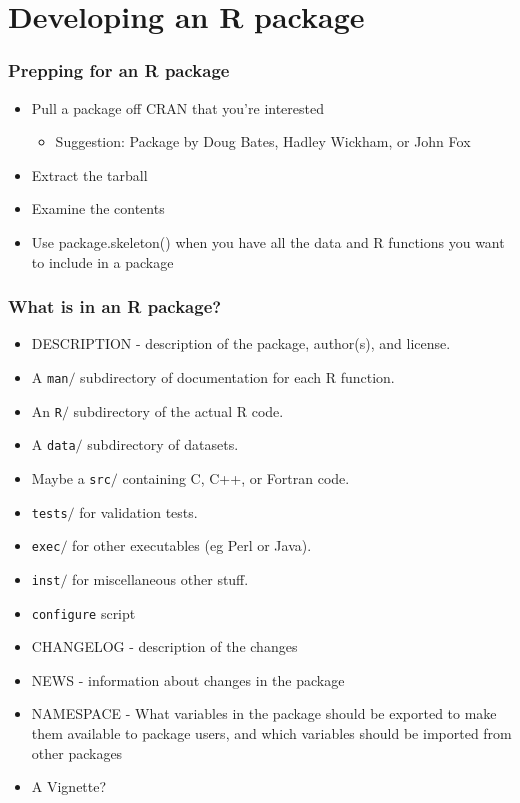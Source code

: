 \documentclass[xcolor=svgnames]{beamer}
\begin{document}
\section{Developing an R package}

\begin{frame}
\frametitle{Prepping for an R package}
\begin{itemize}
  \item Pull a package off CRAN that you're interested
    \begin{itemize}
      \item Suggestion: Package by Doug Bates, Hadley Wickham, or John Fox
    \end{itemize}
  \item Extract the tarball
  \item Examine the contents
  \item Use package.skeleton() when you have all the data and R functions you want to include in a package
    \end{itemize}
\end{frame}


\begin{frame}[fragile]
\frametitle{What is in an R package?}
\begin{itemize}
\item DESCRIPTION - description of the package, author(s), and license.
\item A \texttt{man$/$} subdirectory of documentation for each R function.
\item An  \texttt{R$/$} subdirectory of the actual R code.
\item A \texttt{data$/$} subdirectory of datasets.
\item Maybe a \texttt{src$/$} containing C, C++, or Fortran code.
\item \texttt{tests$/$} for validation tests.
\item \texttt{exec$/$} for other executables (eg Perl or Java).
\item \texttt{inst$/$} for miscellaneous other stuff.
\item \texttt{configure} script
\item CHANGELOG - description of the changes
\item NEWS - information about changes in the package
\item NAMESPACE -  What variables in the package should be exported to make them available to package users, and which variables should be imported from other packages
\item A Vignette?
\end{itemize}
\end{frame}
\end{document}
